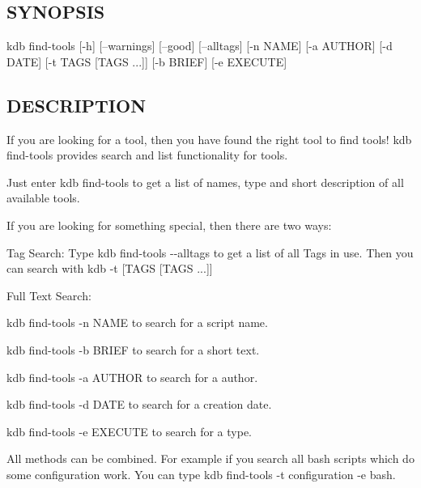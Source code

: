 \subsection*{S\+Y\+N\+O\+P\+S\+IS}

\begin{DoxyVerb}kdb find-tools [-h] [--warnings] [--good] [--alltags] [-n NAME] [-a AUTHOR] [-d DATE]
               [-t TAGS [TAGS ...]] [-b BRIEF] [-e EXECUTE]
\end{DoxyVerb}


\subsection*{D\+E\+S\+C\+R\+I\+P\+T\+I\+ON}

If you are looking for a tool, then you have found the right tool to find tools! {\ttfamily kdb find-\/tools} provides search and list functionality for tools.

Just enter {\ttfamily kdb find-\/tools} to get a list of names, type and short description of all available tools.

If you are looking for something special, then there are two ways\+:


\begin{DoxyEnumerate}
\item Tag Search\+: Type {\ttfamily kdb find-\/tools -\/-\/alltags} to get a list of all Tags in use. Then you can search with {\ttfamily kdb -\/t \mbox{[}T\+A\+GS \mbox{[}T\+A\+GS ...\mbox{]}\mbox{]}}
\item Full Text Search\+:
\begin{DoxyItemize}
\item {\ttfamily kdb find-\/tools -\/n N\+A\+ME} to search for a script name.
\item {\ttfamily kdb find-\/tools -\/b B\+R\+I\+EF} to search for a short text.
\item {\ttfamily kdb find-\/tools -\/a A\+U\+T\+H\+OR} to search for a author.
\item {\ttfamily kdb find-\/tools -\/d D\+A\+TE} to search for a creation date.
\item {\ttfamily kdb find-\/tools -\/e E\+X\+E\+C\+U\+TE} to search for a type.
\end{DoxyItemize}
\end{DoxyEnumerate}

All methods can be combined. For example if you search all bash scripts which do some configuration work. You can type {\ttfamily kdb find-\/tools -\/t configuration -\/e bash}.

